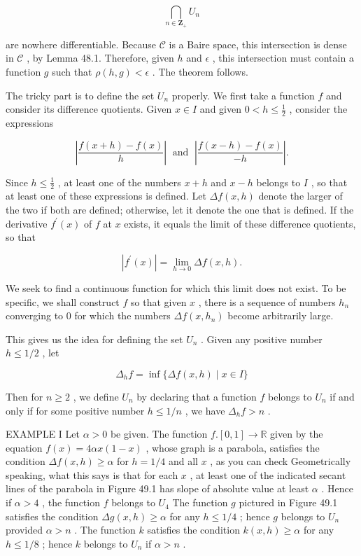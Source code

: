 \[
\mathop{\bigcap }\limits_{{n \in  {\mathbf{Z}}_{ + }}}{U}_{n}
\]

are nowhere differentiable. Because \(\mathcal{C}\) is a Baire space, this intersection is dense in \(\mathcal{C}\) , by Lemma 48.1. Therefore, given \(h\) and \(\epsilon\) , this intersection must contain a function \(g\) such that \(\rho \left( {h,g}\right)  < \epsilon\) . The theorem follows.

The tricky part is to define the set \({U}_{n}\) properly. We first take a function \(f\) and consider its difference quotients. Given \(x \in  I\) and given \(0 < h \leq  \frac{1}{2}\) , consider the expressions

\[
\left| \frac{f\left( {x + h}\right)  - f\left( x\right) }{h}\right| \;\text{ and }\;\left| \frac{f\left( {x - h}\right)  - f\left( x\right) }{-h}\right| .
\]

Since \(h \leq  \frac{1}{2}\) , at least one of the numbers \(x + h\) and \(x - h\) belongs to \(I\) , so that at least one of these expressions is defined. Let \({\Delta f}\left( {x,h}\right)\) denote the larger of the two if both are defined; otherwise, let it denote the one that is defined. If the derivative \({f}^{\prime }\left( x\right)\) of \(f\) at \(x\) exists, it equals the limit of these difference quotients, so that

\[
\left| {{f}^{\prime }\left( x\right) }\right|  = \mathop{\lim }\limits_{{h \rightarrow  0}}{\Delta f}\left( {x,h}\right) .
\]

We seek to find a continuous function for which this limit does not exist. To be specific, we shall construct \(f\) so that given \(x\) , there is a sequence of numbers \({h}_{n}\) converging to 0 for which the numbers \({\Delta f}\left( {x,{h}_{n}}\right)\) become arbitrarily large.

This gives us the idea for defining the set \({U}_{n}\) . Given any positive number \(h \leq  1/2\) , let

\[
{\Delta }_{h}f = \inf \{ {\Delta f}\left( {x,h}\right)  \mid  x \in  I\}
\]

Then for \(n \geq  2\) , we define \({U}_{n}\) by declaring that a function \(f\) belongs to \({U}_{n}\) if and only if for some positive number \(h \leq  1/n\) , we have \({\Delta }_{h}f > n\) .

EXAMPLE I Let \(\alpha  > 0\) be given. The function \(f.\left\lbrack  {0,1}\right\rbrack   \rightarrow  \mathbb{R}\) given by the equation \(f\left( x\right)  = {4\alpha x}\left( {1 - x}\right)\) , whose graph is a parabola, satisfies the condition \({\Delta f}\left( {x,h}\right)  \geq  \alpha\) for \(h = 1/4\) and all \(x\) , as you can check Geometrically speaking, what this says is that for each \(x\) , at least one of the indicated secant lines of the parabola in Figure 49.1 has slope of absolute value at least \(\alpha\) . Hence if \(\alpha  > 4\) , the function \(f\) belongs to \({U}_{4}\) The function \(g\) pictured in Figure 49.1 satisfies the condition \({\Delta g}\left( {x,h}\right)  \geq  \alpha\) for any \(h \leq  1/4\) ; hence \(g\) belongs to \({U}_{n}\) provided \(\alpha  > n\) . The function \(k\) satisfies the condition \(k\left( {x,h}\right)  \geq  \alpha\) for any \(h \leq  1/8\) ; hence \(k\) belongs to \({U}_{n}\) if \(\alpha  > n\) .

